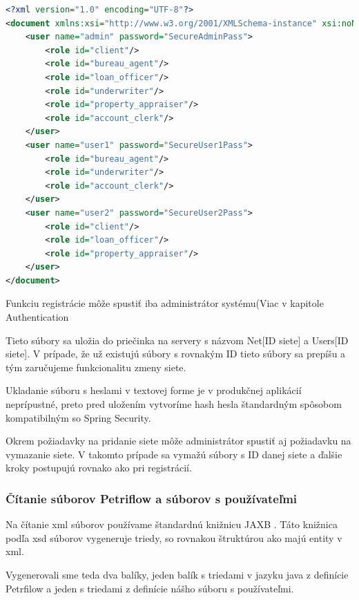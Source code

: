 \begin{lstlisting}[float, caption={Príklad súboru s používateľmi},label={alg:example_users},language=XML] 
<?xml version="1.0" encoding="UTF-8"?> 
<document xmlns:xsi="http://www.w3.org/2001/XMLSchema-instance" xsi:noNamespaceSchemaLocation="./users_schema.xsd"> 
	<user name="admin" password="SecureAdminPass"> 
		<role id="client"/> 
		<role id="bureau_agent"/> 
		<role id="loan_officer"/> 
		<role id="underwriter"/> 
		<role id="property_appraiser"/> 
		<role id="account_clerk"/> 
	</user> 
	<user name="user1" password="SecureUser1Pass"> 
		<role id="bureau_agent"/> 
		<role id="underwriter"/> 
		<role id="account_clerk"/> 
	</user> 
	<user name="user2" password="SecureUser2Pass"> 
		<role id="client"/> 
		<role id="loan_officer"/> 
		<role id="property_appraiser"/> 
	</user> 
</document> 
\end{lstlisting} 

Funkciu registrácie môže spustiť iba administrátor systému(Viac v kapitole Authentication %

Tieto súbory sa uložia do priečinka na servery s názvom Net[ID siete] a Users[ID siete]. V prípade, že už existujú súbory s rovnakým ID tieto súbory sa prepíšu a tým zaručujeme funkcionalitu zmeny siete.  

Ukladanie súboru s heslami v textovej forme je v produkčnej aplikácií neprípustné, preto pred uložením vytvoríme hash hesla štandardným spôsobom kompatibilným so Spring Security. 



Okrem požiadavky na pridanie siete môže administrátor spustiť aj požiadavku na vymazanie siete. V takomto prípade sa vymažú súbory s ID danej siete a ďalšie kroky postupujú rovnako ako pri registrácií. 





\subsubsection{Čítanie súborov Petriflow a súborov s používateľmi} 
Na čítanie \acrshort{xml} súborov používame štandardnú knižnicu JAXB \cite{jaxb}. Táto knižnica podľa \acrshort{xsd} súborov vygeneruje triedy, so rovnakou štruktúrou ako majú entity v \acrshort{xml}. 

Vygenerovali sme teda dva balíky, jeden balík s triedami v jazyku java z definície Petrfilow a jeden s triedami z definície nášho súboru s používateľmi.  

